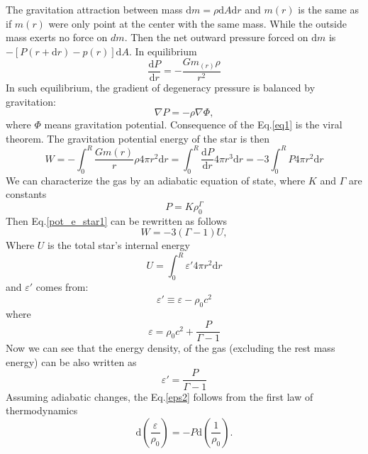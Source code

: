 \documentclass[oneside,a4paper,11pt]{report}
\begin{document}
The gravitation attraction between mass $\mathrm{d}m = \rho \mathrm{d}A \mathrm{d}r$ and $m(r)$ is the same as if $m(r)$ were only point at the center with the same mass. While the outside mass exerts no force on $dm$.
Then the net outward pressure forced on $\mathrm{d}m$ is $- \left [ P\left ( r + \mathrm{d}r \right ) - p(r)  \right ]\mathrm{d}A$. In equilibrium 
\begin{equation}
\label{eq1}
 \frac{\mathrm{d}P}{\mathrm{d}r} = - \frac{Gm_{(r)}\rho}{r^2}
\end{equation}
In such equilibrium, the gradient of degeneracy pressure is balanced by gravitation: 
\begin{equation}
\label{equ_1}
\nabla P = -\rho \nabla \Phi, 
\end{equation}
where $\Phi$ means gravitation potential.  
Consequence of the Eq.\eqref{eq1} is the viral theorem. The gravitation potential energy of the star is then 
\begin{equation}
\label{pot_e_star1}
W = -\int_{0}^{R} \frac{Gm(r)}{r}\rho 4 \pi r^2 \mathrm{d}r = \int_{0}^{R} \frac{\mathrm{d}P}{\mathrm{d}r}4\pi r^3 \mathrm{d}r = -3\int_{0}^{R} P4 \pi r^2 \mathrm{d}r
\end{equation}
We can characterize the gas by an adiabatic equation of state, where $K$ and $\Gamma$ are constants
\begin{equation}
 \label{adiab_1}
P = K\rho_0^\Gamma
\end{equation}
Then Eq.\eqref{pot_e_star1} can be rewritten as follows
\begin{equation}
 W = -3 (\Gamma - 1) U,
\end{equation}
Where $U$ is the total star's internal energy 
\begin{equation}
U = \int_{0}^{R}\varepsilon' 4\pi r^2 \mathrm{d}r 
\end{equation}
and $\varepsilon'$ comes from:
\begin{equation}
\label{eps1}
 \varepsilon' \equiv \varepsilon - \rho_0 c^2
\end{equation}
where
\begin{equation}
 \varepsilon = \rho_0c^2+\frac{P}{\Gamma -1}
\end{equation}
Now we can see that the energy density, of the gas (excluding the rest mass energy) can be also written as
\begin{equation}
 \label{eps2}
 \varepsilon'=\frac{P}{\Gamma - 1}
\end{equation}
Assuming adiabatic changes, the Eq.\eqref{eps2} follows from the first law of thermodynamics
\begin{equation}
 \mathrm{d}\left ( \frac{\varepsilon }{\rho_0} \right ) = -P\mathrm{d}\left ( \frac{1}{\rho_0} \right ) .
\end{equation}
\end{document}
